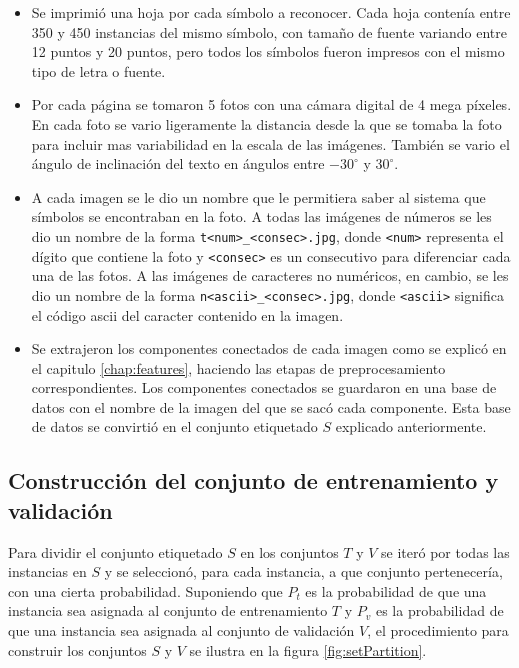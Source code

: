 \documentclass[a4paper, 11pt, oneside]{report}
\begin{document}
\begin{itemize}

	\item Se imprimió una hoja por cada símbolo a reconocer. Cada hoja contenía entre 350 y 450 instancias del mismo símbolo, con tamaño de fuente variando entre 12 puntos y 20 puntos, pero todos los símbolos fueron impresos con el mismo tipo de letra o fuente.

	\item Por cada página se tomaron 5 fotos con una cámara digital de 4 mega píxeles. En cada foto se vario ligeramente la distancia desde la que se tomaba la foto para incluir mas variabilidad en la escala de las imágenes. También se vario el ángulo de inclinación del texto en ángulos entre $-30^\circ$ y $30^\circ$.

	\item A cada imagen se le dio un nombre que le permitiera saber al sistema que símbolos se encontraban en la foto. A todas las imágenes de números se les dio un nombre de la forma \verb/t<num>_<consec>.jpg/, donde \verb/<num>/ representa el dígito que contiene la foto y \verb/<consec>/ es un consecutivo para diferenciar cada una de las fotos. A las imágenes de caracteres no numéricos, en cambio, se les dio un nombre de la forma \verb/n<ascii>_<consec>.jpg/, donde \verb/<ascii>/ significa el código ascii del caracter contenido en la imagen.

	\item Se extrajeron los componentes conectados de cada imagen como se explicó en el capitulo \ref{chap:features}, haciendo las etapas de preprocesamiento correspondientes. Los componentes conectados se guardaron en una base de datos con el nombre de la imagen del que se sacó cada componente. Esta base de datos se convirtió en el conjunto etiquetado $S$ explicado anteriormente.

\end{itemize}

\subsection{Construcción del conjunto de entrenamiento y validación}
\label{sect:trainingSet}

Para dividir el conjunto etiquetado $S$ en los conjuntos $T$ y $V$ se iteró por todas las instancias en $S$ y se seleccionó, para cada instancia, a que conjunto pertenecería, con una cierta probabilidad. Suponiendo que $P_t$ es la probabilidad de que una instancia sea asignada al conjunto de entrenamiento $T$ y $P_v$ es la probabilidad de que una instancia sea asignada al conjunto de validación $V$, el procedimiento para construir los conjuntos $S$ y $V$ se ilustra en la figura \ref{fig:setPartition}.
\end{document}
